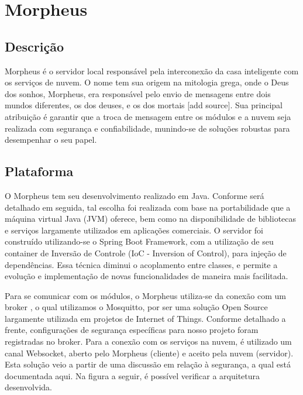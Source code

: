 \section{Morpheus}

\subsection{Descrição}
Morpheus é o servidor local responsável pela interconexão da casa inteligente com os serviços de nuvem. O nome tem sua origem na mitologia grega, onde o Deus dos sonhos, Morpheus, era responsável pelo envio de mensagens entre dois mundos diferentes, os dos deuses, e os dos mortais [add source]. Sua principal atribuição é garantir que a troca de mensagem entre os módulos e a nuvem seja realizada com segurança e confiabilidade, munindo-se de soluções robustas para desempenhar o seu papel.

\subsection{Plataforma}
O Morpheus tem seu desenvolvimento realizado em Java. Conforme será detalhado em seguida, tal escolha foi realizada com base na portabilidade que a máquina virtual Java (JVM) oferece, bem como na disponibilidade de bibliotecas e serviços largamente utilizados em aplicações comerciais. O servidor foi construído utilizando-se o Spring Boot Framework, com a utilização de seu container de Inversão de Controle (IoC - Inversion of Control), para injeção de dependências. Essa técnica diminui o acoplamento entre classes, e permite a evolução e implementação de novas funcionalidades de maneira mais facilitada. 

Para se comunicar com os módulos, o Morpheus utiliza-se da conexão com um broker \wmqtt, o qual utilizamos o Mosquitto, por ser uma solução Open Source largamente utilizada em projetos de Internet of Things. Conforme detalhado a frente, configurações de segurança específicas para nosso projeto foram registradas no broker. Para a conexão com os serviços na nuvem, é utilizado um canal Websocket, aberto pelo Morpheus (cliente) e aceito pela nuvem (servidor). Esta solução veio a partir de uma discussão em relação à segurança, a qual está documentada aqui. Na figura a seguir, é possível verificar a arquitetura desenvolvida.


